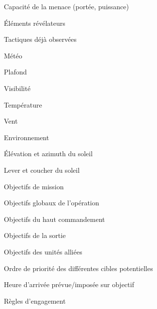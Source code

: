             \ed
            \item Capacité de la menace (portée, puissance)
            \item Éléments révélateurs
            \item Tactiques déjà observées
        \ed
    \ed
    \item Météo
    \ee
        \item Plafond
        \item Visibilité
        \item Température
        \item Vent
    \ed
    \item Environnement
    \ee
        \item Élévation et azimuth du soleil
        \item Lever et coucher du soleil
    \ed
    \item Objectifs de mission
    \ee
        \item Objectifs globaux de l’opération
        \item Objectifs du haut commandement
        \item Objectifs de la sortie
        \item Objectifs des unités alliées
        \item Ordre de priorité des différentes cibles potentielles
        \item Heure d’arrivée prévue/imposée sur objectif
        \item Règles d’engagement
    \ed
\ed




